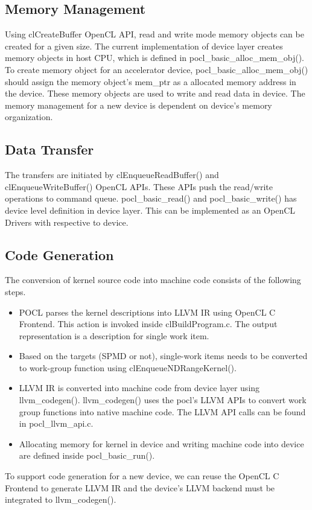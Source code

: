 \subsection{Memory Management}
Using clCreateBuffer OpenCL API, read and write mode memory objects can be created for a given size. The current implementation of device layer creates memory objects in host CPU, which is  defined in pocl\_basic\_alloc\_mem\_obj(). To create memory object for an accelerator device, pocl\_basic\_alloc\_mem\_obj() should assign the memory object's mem\_ptr as a allocated memory address in the device. These memory objects are used to write and read data in device. The memory management for a new device is dependent on device's memory organization.

\subsection{Data Transfer}
The transfers are initiated by clEnqueueReadBuffer() and clEnqueueWriteBuffer() OpenCL APIs. These APIs push the read/write operations to command queue. pocl\_basic\_read() and pocl\_basic\_write() has device level definition in device layer. This can be implemented as an OpenCL Drivers with respective to device.

\subsection{Code Generation}
The conversion of kernel source code into machine code consists of the following steps.
\begin{itemize}
	\item POCL parses the kernel descriptions into LLVM IR using OpenCL C Frontend. This action is invoked inside clBuildProgram.c. The output representation is a description for single work item.
	\item Based on the targets (SPMD or not), single-work items needs to be converted to work-group function using clEnqueueNDRangeKernel().
	\item LLVM IR is converted into machine code from device layer using llvm\_codegen(). llvm\_codegen() uses the pocl's LLVM APIs to convert work group functions into native machine code. The LLVM API calls can be found in pocl\_llvm\_api.c.
	\item Allocating memory for kernel in device and writing machine code into device are defined inside pocl\_basic\_run().
\end{itemize}
To support code generation for a new device, we can reuse the OpenCL C Frontend to generate LLVM IR and the device's LLVM backend must be integrated to llvm\_codegen().
